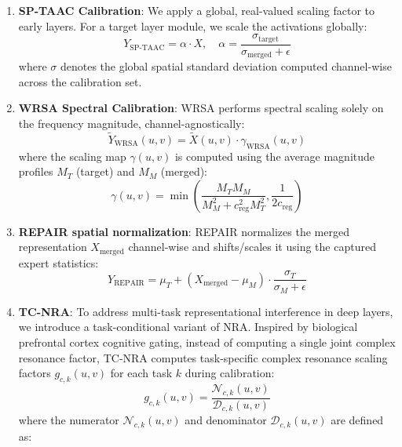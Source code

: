 \documentclass{article}
\theoremstyle{plain}
\theoremstyle{definition}
\theoremstyle{remark}
\begin{document}
\begin{enumerate}
    \item \textbf{SP-TAAC Calibration}:
    We apply a global, real-valued scaling factor to early layers. For a target layer module, we scale the activations globally:
    \begin{equation}
        Y_{\text{SP-TAAC}} = \alpha \cdot X, \quad \alpha = \frac{\sigma_{\text{target}}}{\sigma_{\text{merged}} + \epsilon}
    \end{equation}
    where $\sigma$ denotes the global spatial standard deviation computed channel-wise across the calibration set.
    \item \textbf{WRSA Spectral Calibration}:
    WRSA performs spectral scaling solely on the frequency magnitude, channel-agnostically:
    \begin{equation}
        \tilde{Y}_{\text{WRSA}}(u,v) = \tilde{X}(u,v) \cdot \gamma_{\text{WRSA}}(u,v)
    \end{equation}
    where the scaling map $\gamma(u,v)$ is computed using the average magnitude profiles $M_T$ (target) and $M_M$ (merged):
    \begin{equation}
        \gamma(u,v) = \min\left( \frac{M_T M_M}{M_M^2 + c_{\text{reg}}^2 M_T^2}, \frac{1}{2c_{\text{reg}}} \right)
    \end{equation}
    \item \textbf{REPAIR spatial normalization}:
    REPAIR normalizes the merged representation $X_{\text{merged}}$ channel-wise and shifts/scales it using the captured expert statistics:
    \begin{equation}
        Y_{\text{REPAIR}} = \mu_T + (X_{\text{merged}} - \mu_M) \cdot \frac{\sigma_T}{\sigma_M + \epsilon}
    \end{equation}
    \item \textbf{TC-NRA}:
    To address multi-task representational interference in deep layers, we introduce a task-conditional variant of NRA. Inspired by biological prefrontal cortex cognitive gating, instead of computing a single joint complex resonance factor, TC-NRA computes task-specific complex resonance scaling factors $g_{c,k}(u,v)$ for each task $k$ during calibration:
    \begin{equation}
        g_{c, k}(u, v) = \frac{\mathcal{N}_{c, k}(u, v)}{\mathcal{D}_{c, k}(u, v)}
    \end{equation}
    where the numerator $\mathcal{N}_{c, k}(u, v)$ and denominator $\mathcal{D}_{c, k}(u, v)$ are defined as:
    \begin{align}

\end{align}
\end{enumerate}
\end{document}
